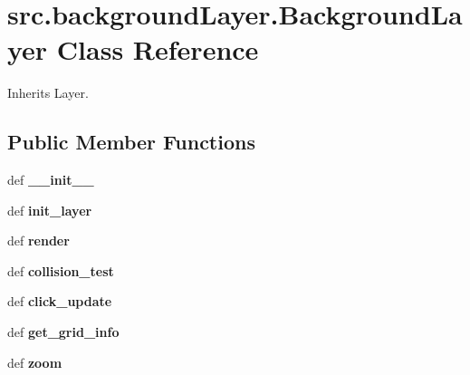 \hypertarget{classsrc_1_1background_layer_1_1_background_layer}{\section{src.\-background\-Layer.\-Background\-Layer \-Class \-Reference}
\label{classsrc_1_1background_layer_1_1_background_layer}
}


\-Inherits \-Layer.

\subsection*{\-Public \-Member \-Functions}
\begin{DoxyCompactItemize}
\item 
\hypertarget{classsrc_1_1background_layer_1_1_background_layer_ae7e7e455a7a88cdab390a9cb93a9eb4a}{def {\bfseries \-\_\-\-\_\-init\-\_\-\-\_\-}}\label{classsrc_1_1background_layer_1_1_background_layer_ae7e7e455a7a88cdab390a9cb93a9eb4a}

\item 
\hypertarget{classsrc_1_1background_layer_1_1_background_layer_ad8afb5ff0c6e1b50bf46eb3e4b46e2dd}{def {\bfseries init\-\_\-layer}}\label{classsrc_1_1background_layer_1_1_background_layer_ad8afb5ff0c6e1b50bf46eb3e4b46e2dd}

\item 
\hypertarget{classsrc_1_1background_layer_1_1_background_layer_a162fbe6dab81ed5558efffa508ba0666}{def {\bfseries render}}\label{classsrc_1_1background_layer_1_1_background_layer_a162fbe6dab81ed5558efffa508ba0666}

\item 
\hypertarget{classsrc_1_1background_layer_1_1_background_layer_a73489d709ee450b021a1a459d694a190}{def {\bfseries collision\-\_\-test}}\label{classsrc_1_1background_layer_1_1_background_layer_a73489d709ee450b021a1a459d694a190}

\item 
\hypertarget{classsrc_1_1background_layer_1_1_background_layer_a7b4f4b6825d38a5f142035a38311764b}{def {\bfseries click\-\_\-update}}\label{classsrc_1_1background_layer_1_1_background_layer_a7b4f4b6825d38a5f142035a38311764b}

\item 
\hypertarget{classsrc_1_1background_layer_1_1_background_layer_a1ce10e002026bf3d6c9fd9392ebb479d}{def {\bfseries get\-\_\-grid\-\_\-info}}\label{classsrc_1_1background_layer_1_1_background_layer_a1ce10e002026bf3d6c9fd9392ebb479d}

\item 
\hypertarget{classsrc_1_1background_layer_1_1_background_layer_aad56a2c47f2b5ad7281b0aa55afefa4a}{def {\bfseries zoom}}\label{classsrc_1_1background_layer_1_1_background_layer_aad56a2c47f2b5ad7281b0aa55afefa4a}

\end{DoxyCompactItemize}
